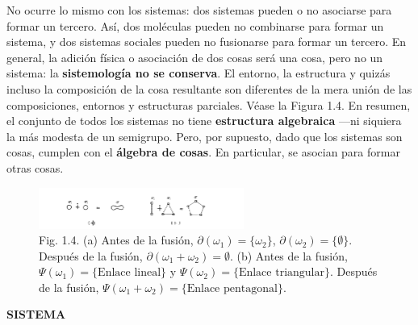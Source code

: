 {No ocurre lo mismo con los sistemas: dos sistemas pueden o no asociarse para formar un tercero. Así, dos moléculas pueden no combinarse para formar un sistema, y dos sistemas sociales pueden no fusionarse para formar un tercero. En general, la adición física o asociación de dos cosas será una cosa, pero no un sistema: la \textbf{sistemología no se conserva}. El entorno, la estructura y quizás incluso la composición de la cosa resultante son diferentes de la mera unión de las composiciones, entornos y estructuras parciales. Véase la Figura 1.4. En resumen, el conjunto de todos los sistemas no tiene \textbf{estructura algebraica} —ni siquiera la más modesta de un semigrupo. Pero, por supuesto, dado que los sistemas son cosas, cumplen con el \textbf{álgebra de cosas}. En particular, se asocian para formar otras cosas.
\begin{figure}[h!]
    \centering
    \includegraphics[width=0.6\textwidth]{imagenes/figura1.4.png}
    \caption*{Fig. 1.4. (a) Antes de la fusión, $\partial(\omega_1) = \{\omega_2\}$, $\partial(\omega_2) = \{\emptyset\}$. Después de la fusión, $\partial(\omega_1 + \omega_2) = \emptyset$. (b) Antes de la fusión, $\Psi(\omega_1) = \{\text{Enlace lineal}\}$ y $\Psi(\omega_2) = \{\text{Enlace triangular}\}$. Después de la fusión, $\Psi(\omega_1 + \omega_2) = \{\text{Enlace pentagonal}\}$.}
\end{figure}

}
\newpage
\fancyhf{}
\fancyhead[R]{\thepage} 
\begin{center}
{\fontsize{13}{16}\selectfont \textbf{SISTEMA}}
\end{center}
\vspace{0.5cm}

